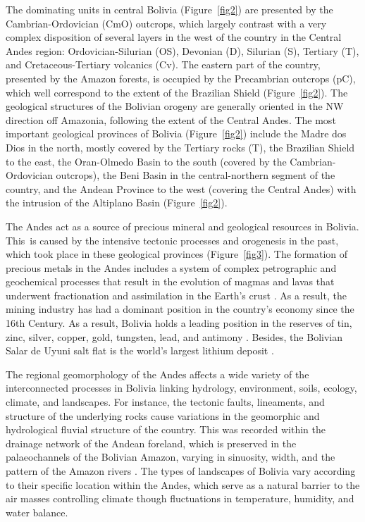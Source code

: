 \documentclass[data,article,accept,pdftex,moreauthors]{Definitions/mdpi}
\begin{document}
The dominating units in central Bolivia (Figure~\ref{fig2}) are presented by the Cambrian-Ordovician (CmO) outcrops,{ }which largely contrast with a very complex disposition of several layers in the west of the country in the Central Andes region: {Ordovician-Silurian} (OS), Devonian (D), Silurian (S), Tertiary (T), and {Cretaceous-Tertiary volcanics (Cv)}. The eastern part of the country{, presented by }the Amazon forests{, }is occupied by the Precambrian outcrops (pC), which well correspond to the extent of the Brazilian Shield (Figure~\ref{fig2}). {The} geological structures of the Bolivian orogeny {are generally }oriented {in} the NW direction off Amazonia{, }following the extent of the Central Andes. The most important geological provinces of Bolivia (Figure~\ref{fig2}) include {the} Madre dos Dios in the north, mostly covered by the{ }Tertiary rocks (T), the Brazilian Shield to the east, the Oran-Olmedo Basin to the south (covered by the Cambrian-Ordovician outcrops), the Beni Basin in the central-northern segment of the country, and the Andean Province to the west (covering the Central Andes) with {the} intrusion of the Altiplano Basin (Figure~\ref{fig2}). 

{The} Andes act as a source of precious mineral and geological resources in Bolivia. {\mbox{This is} caused by the} intensive tectonic processes and orogenesis {in the past, which took place} in {these geological} provinces (Figure~\ref{fig3}). The formation of {precious} metals in the Andes includes {a system of} complex petrographic and geochemical processes that result{ }in the evolution of magmas and lavas that underwent fractionation and assimilation in the Earth's crust \cite{Redwood}. As a result, the mining industry {}has had a dominant position in the country's economy since {the }16th Century. {As a result, Bolivia holds a} leading position{ }in {the} reserves of tin, zinc, silver, copper, gold, tungsten, lead, {and} antimony \cite{Iqbal,DiazCuellar,Guedron,Pavilonis}. {Besides,} the Bolivian Salar de Uyuni salt flat is the world's largest lithium deposit \cite{Narins,Sanchez}. 

{The} regional geomorphology of {the} Andes affects a wide variety of {the} interconnected {processes} {in} Bolivia {linking} hydrology, environment, soils, ecology, climate, and landscapes. For instance, the tectonic faults, lineaments, and structure of the underlying rocks cause variations in the geomorphic and hydrological fluvial structure of {the country}. This was recorded within the drainage network of the Andean foreland, which is preserved in the {palaeochannels} of the Bolivian Amazon, {varying} in sinuosity, width, and the pattern of the Amazon rivers \cite{Plotzki}. {The types of} landscapes of Bolivia vary according to their {specific} location within {the} Andes, which serve as a natural barrier to the air masses controlling climate {though} fluctuations in temperature{, }humidity, and water balance{.} 
\end{document}
